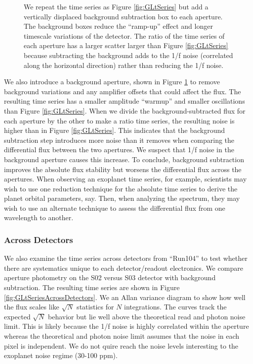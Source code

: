 \documentclass{aastex62}
\begin{document}
\begin{figure}
\caption{We repeat the time series as Figure \ref{fig:GLtSeries} but add a vertically displaced background subtraction box to each aperture.
The background boxes reduce the ``ramp-up'' effect and longer timescale variations of the detector.
The ratio of the time series of each aperture has a larger scatter larger than Figure \ref{fig:GLtSeries} because subtracting the background adds to the 1/f noise (correlated along the horizontal direction) rather than reducing the 1/f noise.
}\label{fig:GLtSeriesBacksub}
\end{figure}

We also introduce a background aperture, shown in Figure \ref{fig:GLtSeriesBacksub} to remove background variations and any amplifier offsets that could affect the flux.
The resulting time series has a smaller amplitude ``warmup'' and smaller oscillations than Figure \ref{fig:GLtSeries}.
When we divide the background-subtracted flux for each aperture by the other to make a ratio time series, the resulting noise is higher than in Figure \ref{fig:GLtSeries}.
This indicates that the background subtraction step introduces more noise than it removes when comparing the differential flux between the two apertures.
We suspect that 1/f noise in the background aperture causes this increase.
To conclude, background subtraction improves the absolute flux stability but worsens the differential flux across the apertures.
When observing an exoplanet time series, for example, scientists may wish to use one reduction technique for the absolute time series to derive the planet orbital parameters, say.
Then, when analyzing the spectrum, they may wish to use an alternate technique to assess the differential flux from one wavelength to another.

\subsubsection{Across Detectors}
We also examine the time series across detectors from ``Run104'' to test whether there are systematics unique to each detector/readout electronics.
We compare aperture photometry on the S02 versus S03 detector with background subtraction.
The resulting time series are shown in Figure \ref{fig:GLtSeriesAcrossDetectors}.
We an Allan variance diagram to show how well the flux scales like $\sqrt{N}$ statistics for $N$ integrations.
The curves track the expected $\sqrt{N}$ behavior but lie well above the theoretical read and photon noise limit.
This is likely because the 1/f noise is highly correlated within the aperture whereas the theoretical and photon noise limit assumes that the noise in each pixel is independent.
We do not quire reach the noise levels interesting to the exoplanet noise regime (30-100 ppm).
\end{document}
